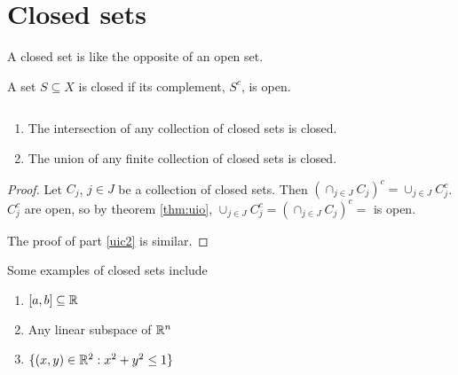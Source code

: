 \section{Closed sets}

A closed set is like the opposite of an open set. 
\begin{definition}
  A set $S \subseteq X$ is closed if its complement, $S^c$, is open. 
\end{definition}
\begin{theorem} $\;$\label{thm:uic}
  \begin{enumerate}
  \item The intersection of any collection of closed sets is closed.
  \item\label{uic2} The union of any finite collection of closed sets is closed. 
  \end{enumerate}
\end{theorem}
\begin{proof}
  Let $C_j$, $j\in J$ be a collection of closed sets. Then 
  $ \left(\cap_{j \in J} C_j\right)^c = \cup_{j \in J}
  C^c_j $. 
  $C^c_j$ are open, so by theorem \ref{thm:uio},  $\cup_{j \in J}
  C^c_j = \left(\cap_{j \in J} C_j\right)^c =$ is open.  
  
  The proof of part \ref{uic2} is similar. 
\end{proof}

\begin{example}
  Some examples of closed sets include
  \begin{enumerate}
  \item $[a,b] \subseteq \mathbb{R}$
  \item Any linear subspace of $\mathbb{R}^n$
  \item $\{(x,y) \in \mathbb{R}^2: x^2 + y^2 \leq 1\}$
  \end{enumerate}
\end{example}

